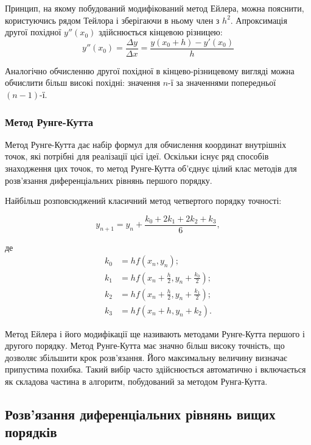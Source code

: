 Принцип, на якому побудований модифікований метод Ейлера,
можна пояснити, користуючись рядом Тейлора і зберігаючи в ньому
член з $h^2$. Апроксимація другої похідної $y''(x_0)$ здійснюється кінцевою різницею:
\begin{equation}\label{eq:E3_riz}
  y''(x_0)=\frac{\Delta y}{\Delta x}=\frac{y(x_0+h)-y'(x_0)}{h}
\end{equation}

Аналогічно обчисленню другої похідної в кінцево-різницевому
вигляді можна обчислити більш високі похідні: значення
$n$-ї за значеннями попередньої $(n-1)$-ї.  

\subsubsection{Метод Рунге-Кутта}\label{sss:E4}

Метод Рунге-Кутта дає набір формул для обчислення координат
внутрішніх точок, які потрібні для реалізації цієї ідеї.
Оскільки існує ряд способів знаходження цих точок, то метод
Рунге-Кутта об’єднує цілий клас методів для розв’язання
диференціальних рівнянь першого порядку.

Найбільш розповсюджений класичний метод четвертого порядку 
точності:

\begin{equation}\label{eq:E4}
  y_{n+1}=y_n+\frac{k_0+2k_1+2k_2+k_3}{6},
\end{equation}

де
\begin{equation}\label{eq:E4_k}
  \begin{split}
    k_0 &= hf(x_n,y_n);\\
    k_1 &= hf(x_n+\frac{h}{2},y_n+\frac{k_0}{2});\\
    k_2 &= hf(x_n+\frac{h}{2},y_n+\frac{k_1}{2});\\
    k_3 &= hf(x_n+h,y_n+k_2).
  \end{split}
\end{equation}

Метод Ейлера і його модифікації ще називають методами
Рунге-Кутта першого і другого порядку. Метод Рунге-Кутта має
значно більш високу точність, що дозволяє збільшити крок
розв’язання. Його максимальну величину визначає припустима
похибка. Такий вибір часто здійснюється автоматично і
включається як складова частина в алгоритм, побудований за
методом Рунга-Кутта.

\subsection{Розв'язання диференціальних рівнянь вищих порядків}

